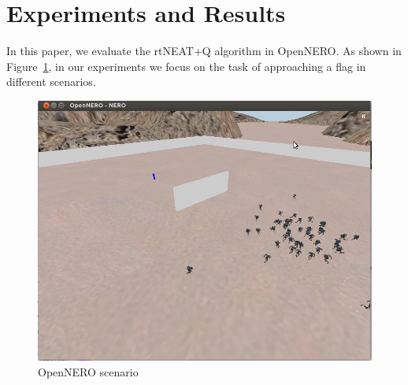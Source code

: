 \documentclass[letterpaper]{article}
\begin{document}
\section{Experiments and Results}
\label{sec:exp}
In this paper, we evaluate the rtNEAT+Q algorithm in OpenNERO. As shown in Figure~\ref{fig:opennero}, in our experiments we focus on the task of approaching a flag in different scenarios.
\begin{figure}[ht]
\centering
  \includegraphics[width=0.7\columnwidth]{opennero.png}
\caption{OpenNERO scenario}
\label{fig:opennero}
\end{figure}
\end{document}
